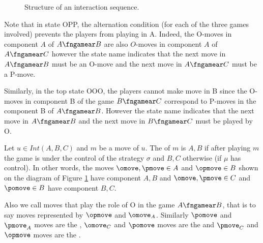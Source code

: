 \begin{figure}[htbp]
\begin{center}
\end{center}
\caption{Structure of an interaction sequence.} \label{fig:interseq}
\end{figure}

Note that in state OPP, the alternation condition (for each of the
three games involved) prevents the players from playing in A.
Indeed, the O-moves in component $A$ of $A\fngamear B$ are also
$O$-moves in component $A$ of $A\fngamear C$ however the state name
indicates that the next move in $A\fngamear B$ must be an O-move and
the next move in $A\fngamear C$ must be a P-move.

Similarly, in the top state OOO, the players cannot make move in B
since the O-moves in component B of the game $B\fngamear C$
correspond to P-moves in the component B of $A\fngamear B$. However
the state name indicates that the next move in $A\fngamear B$ and
the next move in $B\fngamear C$ must be played by O.


Let $u \in Int(A,B,C)$ and $m$ be a move of $u$. The
 of $m$ is $A,B$ if after playing $m$ the game is
under the control of the strategy $\sigma$ and $B,C$ otherwise (if
$\mu$ has control). In other words, the moves $\omove, \pmove \in A$
and $\opmove \in B$ shown on the diagram of Figure
\ref{fig:interseq} have component $A,B$ and $\omove, \pmove \in C$
and $\pomove \in B$ have component $B,C$.


Also we call  moves
that play the role of O in the game $A\fngamear B$, that is to say
moves represented by $\opmove$ and $\omove_A$. Similarly $\pomove$
and $\pmove_A$ moves are the , $\omove_C$ and $\pomove$ moves are the
 and  $\pmove_C$ and
$\opmove$ moves are the .


